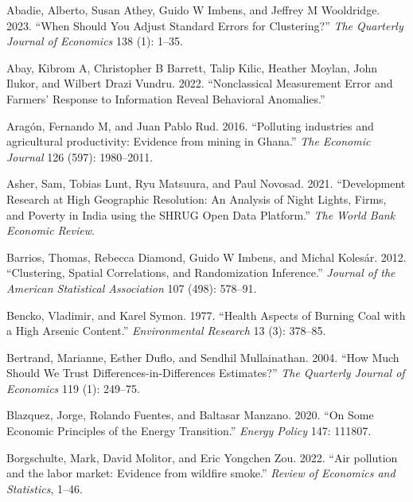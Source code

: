 \documentclass[
]{article}
\newlength{\cslhangindent}
\newlength{\cslentryspacingunit} %
\newenvironment{CSLReferences}[2] %
 {%
  \setlength{\parindent}{0pt}
  \ifodd #1
  \let\oldpar\par
  \def\par{\hangindent=\cslhangindent\oldpar}
  \fi
  \setlength{\parskip}{#2\cslentryspacingunit}
 }%
 {}
\begin{document}
\hypertarget{refs}{}
\begin{CSLReferences}{1}{0}
\leavevmode{}%
Abadie, Alberto, Susan Athey, Guido W Imbens, and Jeffrey M Wooldridge. 2023. {``When Should You Adjust Standard Errors for Clustering?''} \emph{{The Quarterly Journal of Economics}} 138 (1): 1--35.

\leavevmode{}%
Abay, Kibrom A, Christopher B Barrett, Talip Kilic, Heather Moylan, John Ilukor, and Wilbert Drazi Vundru. 2022. {``{Nonclassical Measurement Error and Farmers' Response to Information Reveal Behavioral Anomalies}.''}

\leavevmode{}%
Aragón, Fernando M, and Juan Pablo Rud. 2016. {``{Polluting industries and agricultural productivity: Evidence from mining in Ghana}.''} \emph{{The Economic Journal}} 126 (597): 1980--2011.

\leavevmode{}%
Asher, Sam, Tobias Lunt, Ryu Matsuura, and Paul Novosad. 2021. {``{Development Research at High Geographic Resolution: An Analysis of Night Lights, Firms, and Poverty in India using the SHRUG Open Data Platform}.''} \emph{{The World Bank Economic Review}}.

\leavevmode{}%
Barrios, Thomas, Rebecca Diamond, Guido W Imbens, and Michal Kolesár. 2012. {``Clustering, Spatial Correlations, and Randomization Inference.''} \emph{{Journal of the American Statistical Association}} 107 (498): 578--91.

\leavevmode{}%
Bencko, Vladimir, and Karel Symon. 1977. {``Health Aspects of Burning Coal with a High Arsenic Content.''} \emph{{Environmental Research}} 13 (3): 378--85.

\leavevmode{}%
Bertrand, Marianne, Esther Duflo, and Sendhil Mullainathan. 2004. {``How Much Should We Trust Differences-in-Differences Estimates?''} \emph{{The Quarterly Journal of Economics}} 119 (1): 249--75.

\leavevmode{}%
Blazquez, Jorge, Rolando Fuentes, and Baltasar Manzano. 2020. {``On Some Economic Principles of the Energy Transition.''} \emph{{Energy Policy}} 147: 111807.

\leavevmode{}%
Borgschulte, Mark, David Molitor, and Eric Yongchen Zou. 2022. {``{Air pollution and the labor market: Evidence from wildfire smoke}.''} \emph{{Review of Economics and Statistics}}, 1--46.


\end{CSLReferences}
\end{document}
